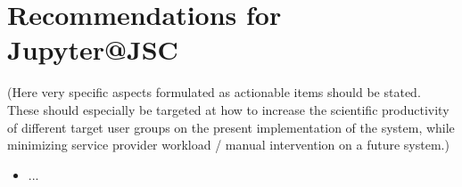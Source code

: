\section{Recommendations for Jupyter@JSC}

(Here very specific aspects formulated as actionable items should be stated. These should especially be targeted at how to increase the scientific productivity of different target user groups on the present implementation of the system, while minimizing service provider workload / manual intervention on a future system.)

\begin{itemize}
  \item ...
\end{itemize}

